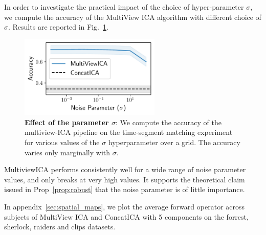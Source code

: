 In order to investigate the practical impact of the choice of hyper-parameter
$\sigma$, we compute the accuracy of the MultiView ICA algorithm with different
choice of $\sigma$.
Results are reported in Fig.~\ref{fig:supp_noise_sensitivity}. 
\begin{figure}
  \centering
  \includegraphics[width=0.6\textwidth]{figures/mvica/noise_sensitivity.pdf}
  \caption{\textbf{Effect of the parameter $\sigma$}: We compute the accuracy of the multiview-ICA pipeline on the time-segment matching experiment for various values of the $\sigma$ hyperparameter over a grid. The accuracy varies only marginally with $\sigma$.}
  \label{fig:supp_noise_sensitivity}
\end{figure}
MultiviewICA performs consistently well for a wide range of noise parameter values, and only breaks at very high values. It supports the theoretical claim issued in Prop~\ref{prop:robust} that the noise parameter is of little importance.

In appendix~\ref{sec:spatial_maps}, we plot the average forward operator across subjects of MultiView ICA and ConcatICA with 5 components on the forrest, sherlock, raiders and clips datasets.



